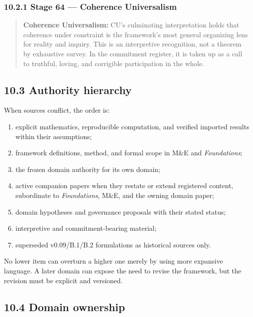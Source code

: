 \documentclass[
  11pt,
]{article}
\providecommand{\tightlist}{%
  \setlength{\itemsep}{0pt}\setlength{\parskip}{0pt}}
\begin{document}
\subsubsection{10.2.1 Stage 64 --- Coherence
Universalism}\label{stage-64-coherence-universalism}

\begin{quote}
\textbf{Coherence Universalism:} CU's culminating interpretation holds
that coherence under constraint is the framework's most general
organizing lens for reality and inquiry. This is an interpretive
recognition, not a theorem by exhaustive survey. In the commitment
register, it is taken up as a call to truthful, loving, and corrigible
participation in the whole.
\end{quote}

\subsection{10.3 Authority hierarchy}\label{authority-hierarchy}

When sources conflict, the order is:

\begin{enumerate}
\def\labelenumi{\arabic{enumi}.}
\tightlist
\item
  explicit mathematics, reproducible computation, and verified imported
  results within their assumptions;
\item
  framework definitions, method, and formal scope in M\&E and
  \emph{Foundations};
\item
  the frozen domain authority for its own domain;
\item
  active companion papers when they restate or extend registered
  content, subordinate to \emph{Foundations}, M\&E, and the owning
  domain paper;
\item
  domain hypotheses and governance proposals with their stated status;
\item
  interpretive and commitment-bearing material;
\item
  superseded v0.09/B.1/B.2 formulations as historical sources only.
\end{enumerate}

No lower item can overturn a higher one merely by using more expansive
language. A later domain can expose the need to revise the framework,
but the revision must be explicit and versioned.

\subsection{10.4 Domain ownership}\label{domain-ownership}
\end{document}
